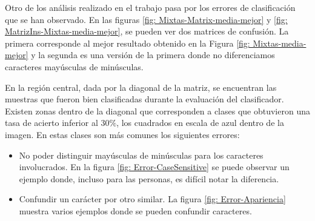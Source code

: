 	Otro de los análisis realizado en el trabajo pasa por los errores de clasificación que se han observado. En las figuras \ref{fig: Mixtas-Matrix-media-mejor} y \ref{fig: MatrizIns-Mixtas-media-mejor}, se pueden ver dos matrices de confusión. La primera corresponde al mejor resultado obtenido en la Figura \ref{fig: Mixtas-media-mejor} y la segunda es una versión de la primera donde no diferenciamos caracteres mayúsculas de minúsculas.

	En la región central, dada por la diagonal de la matriz, se encuentran las muestras que fueron bien clasificadas durante la evaluación del clasificador. Existen zonas dentro de la diagonal que corresponden a clases que obtuvieron una tasa de acierto inferior al $30\%$, los cuadrados en escala de azul dentro de la imagen. En estas clases son más comunes los siguientes errores:

	\begin{itemize}
		\item No poder distinguir mayúsculas de minúsculas para los caracteres involucrados. En la figura \ref{fig: Error-CaseSensitive} se puede observar un ejemplo donde, incluso para las personas, es difícil notar la diferencia.
		\item Confundir un carácter por otro similar. La figura \ref{fig: Error-Apariencia} muestra varios ejemplos donde se pueden confundir caracteres.
	\end{itemize}

